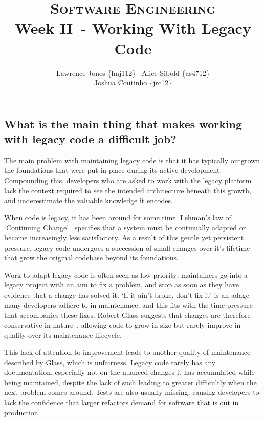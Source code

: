 \documentclass[11pt]{article}
\title{\textsc{Software Engineering}\\Week II~- Working With Legacy Code}
\author{Lawrence Jones \{lmj112\} \  Alice Sibold \{as4712\} \\
        Joshua Coutinho \{jrc12\}}
\date{}
\begin{document}
\maketitle


\subsection*{What is the main thing that makes working with legacy code a
difficult job?}

The main problem with maintaining legacy code is that it has typically outgrown
the foundations that were put in place during its active development.
Compounding this, developers who are asked to work with the legacy platform lack
the context required to see the intended architecture beneath this growth, and
underestimate the valuable knowledge it encodes.

When code is legacy, it has been around for some time. Lehman's law of
`Continuing Change'~\cite{lehman} specifies that a system must be continually
adapted or become increasingly less satisfactory. As a result of this gentle yet
persistent pressure, legacy code undergoes a succession of small changes over
it's lifetime that grow the original codebase beyond its foundations.

Work to adapt legacy code is often seen as low priority; maintainers go into a
legacy project with an aim to fix a problem, and stop as soon as they have
evidence that a change has solved it. `If it ain't broke, don't fix it' is an
adage many developers adhere to in maintenance, and this fits with the time
pressure that accompanies these fixes. Robert Glass suggests that changes are
therefore conservative in nature~\cite{softwareConflict}, allowing code to grow
in size but rarely improve in quality over its maintenance lifecycle.

This lack of attention to improvement leads to another quality of maintenance
described by Glass, which is unfairness. Legacy code rarely has any
documentation, especially not on the nuanced changes it has accumulated while
being maintained, despite the lack of such leading to greater difficultly when
the next problem comes around. Tests are also usually missing, causing
developers to lack the confidence that larger refactors demand for software that
is out in production.
\end{document}
